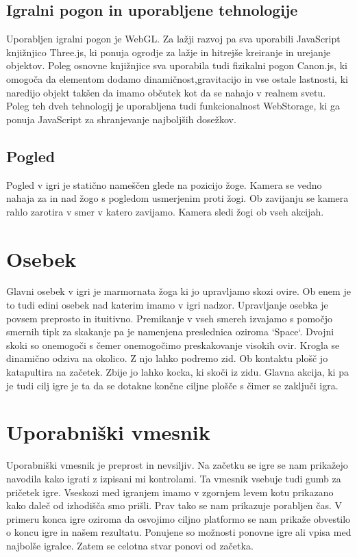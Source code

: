 \documentclass[a4paper]{article}
\begin{document}
\subsection{Igralni pogon in uporabljene tehnologije}
Uporabljen igralni pogon je WebGL. Za lažji razvoj pa sva uporabili JavaScript knjižnjico Three.js, ki ponuja ogrodje za lažje in hitrejše kreiranje in urejanje objektov. Poleg osnovne knjižnjice sva uporabila tudi fizikalni pogon Canon.js, ki omogoča da elementom dodamo dinamičnost,gravitacijo in vse ostale lastnosti, ki naredijo objekt takšen da imamo občutek kot da se nahajo v realnem svetu. Poleg teh dveh tehnologij je uporabljena tudi funkcionalnost WebStorage, ki ga ponuja JavaScript za shranjevanje najboljših dosežkov.

\subsection{Pogled}
Pogled v igri je statično nameščen glede na pozicijo žoge. Kamera se vedno nahaja za in nad žogo s pogledom usmerjenim proti žogi. Ob zavijanju se kamera rahlo zarotira v smer v katero zavijamo. Kamera sledi žogi ob vseh akcijah.

\section{Osebek}
Glavni osebek v igri je marmornata žoga ki jo upravljamo skozi ovire. Ob enem je to tudi edini osebek nad katerim imamo v igri nadzor. Upravljanje osebka je povsem preprosto in ituitivno. Premikanje v vseh smereh izvajamo s pomočjo smernih tipk za skakanje pa je namenjena preslednica oziroma  `Space`.  Dvojni skoki so onemogoči s čemer onemogočimo preskakovanje visokih ovir. Krogla se dinamično odziva na okolico. Z njo lahko podremo zid. Ob kontaktu plošč jo katapultira na začetek. Zbije jo lahko kocka, ki skoči iz zidu. Glavna akcija, ki pa je tudi cilj igre je ta da se dotakne končne ciljne plošče s čimer se zaključi igra.


\section{Uporabniški vmesnik}
Uporabniški vmesnik je preprost in nevsiljiv. Na začetku se igre se nam prikažejo navodila kako igrati z izpisani mi kontrolami. Ta vmesnik vsebuje tudi gumb za pričetek igre. Vseskozi med igranjem imamo v zgornjem levem kotu prikazano kako daleč od izhodišča smo prišli. Prav tako se nam prikazuje porabljen čas. V primeru konca igre oziroma da osvojimo ciljno platformo se nam prikaže obvestilo o koncu igre in našem rezultatu. Ponujene so možnosti ponovne igre ali vpisa med najbolše igralce. Zatem se celotna stvar ponovi od začetka.
\end{document}
